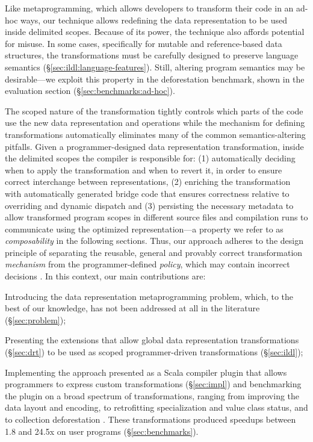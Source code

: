 Like metaprogramming, which allows developers to transform their code in an ad-hoc ways, our technique allows redefining the data representation to be used inside delimited scopes. Because of its power, the technique also affords potential for misuse. In some cases, specifically for mutable and reference-based data structures, the transformations must be carefully designed to preserve language semantics
(\S\ref{sec:ildl:language-features}). Still, altering program semantics may be desirable---we exploit this property in the deforestation benchmark, shown in the evaluation section (\S\ref{sec:benchmarks:ad-hoc}).

The scoped nature of the transformation tightly controls which parts of the code use the new data representation and operations while the mechanism for defining transformations automatically eliminates
many of the common semantics-altering pitfalls. Given a programmer-designed data representation transformation, inside the delimited scopes the compiler is responsible for: (1) automatically deciding when to apply the transformation and when to revert it, in order to ensure correct interchange between representations, (2) enriching the transformation with automatically generated bridge code that ensures correctness relative to overriding and dynamic dispatch and (3) persisting the necessary metadata to allow transformed program scopes in different source files and compilation runs to communicate using the optimized representation---a property we refer to as \emph{composability} in the following sections. Thus, our approach adheres to the design principle of separating the reusable, general and provably correct transformation \emph{mechanism} from the programmer-defined \emph{policy}, which may contain incorrect decisions \cite{lampson-mechanism-policy}. In this context, our main contributions are:
\vspace{0.25em}
\begin{compactitem}
  \item Introducing the data representation metaprogramming problem, which, to the best of our knowledge, has not been addressed at all in the literature (\S\ref{sec:problem});
  \item Presenting the extensions that allow global data representation transformations (\S\ref{sec:drt}) to be used as scoped programmer-driven transformations (\S\ref{sec:ildl});
  \item Implementing the approach presented as a Scala compiler plugin \cite{ildl-plugin} that allows programmers to express custom transformations (\S\ref{sec:impl}) and benchmarking the plugin on a broad spectrum of transformations, ranging from improving the data layout and encoding, to retrofitting specialization and value class status, and to collection deforestation \cite{wadler-deforestation}. These transformations produced  speedups between 1.8 and 24.5x on user programs (\S\ref{sec:benchmarks}).
\end{compactitem}
